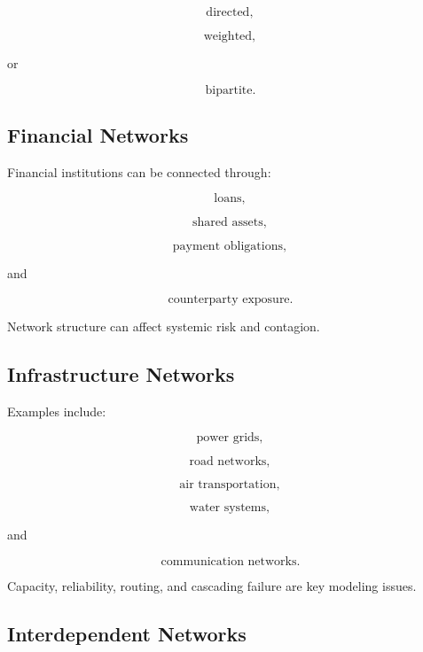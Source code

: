 \[
\boxed{
\text{directed},
}
\]

\[
\boxed{
\text{weighted},
}
\]

or

\[
\boxed{
\text{bipartite}.
}
\]

\subsection{Financial Networks}
\label{subsec:financial-networks}

Financial institutions can be connected through:

\[
\boxed{
\text{loans},
}
\]

\[
\boxed{
\text{shared assets},
}
\]

\[
\boxed{
\text{payment obligations},
}
\]

and

\[
\boxed{
\text{counterparty exposure}.
}
\]

Network structure can affect systemic risk and contagion.

\subsection{Infrastructure Networks}
\label{subsec:infrastructure-networks}

Examples include:

\[
\boxed{
\text{power grids},
}
\]

\[
\boxed{
\text{road networks},
}
\]

\[
\boxed{
\text{air transportation},
}
\]

\[
\boxed{
\text{water systems},
}
\]

and

\[
\boxed{
\text{communication networks}.
}
\]

Capacity, reliability, routing, and cascading failure are key modeling issues.

\subsection{Interdependent Networks}
\label{subsec:interdependent-networks}

